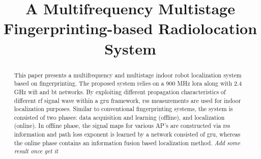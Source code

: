 \documentclass[conference]{IEEEtran}
\begin{document}
%
\title{A Multifrequency Multistage Fingerprinting-based Radiolocation System}


\author{
\and
{}
}

\maketitle

\begin{abstract}
    This paper presents a multifrequency and multistage indoor robot localization system based on fingerprinting.
    The proposed system relies on a 900 MHz \gls{lora} along with 2.4 GHz \gls{wifi} and \gls{bt} networks.
    By exploiting different propagation characteristics of different \gls{rf} signal wave within a \gls{gru} framework, \gls{rss} measurements are used for indoor localization purposes.
    Similar to conventional fingerprinting systems, the system is consisted of two phases: data acquisition and learning (offline), and localization (online).
    In offline phase, the signal maps for various AP's are constructed via \gls{rss} information and path loss exponent is learned by a network consisted of \gls{gru}, whereas the online phase contains an information fusion based localization method.
    \textit{Add some result once get it}
\end{abstract}
\end{document}
